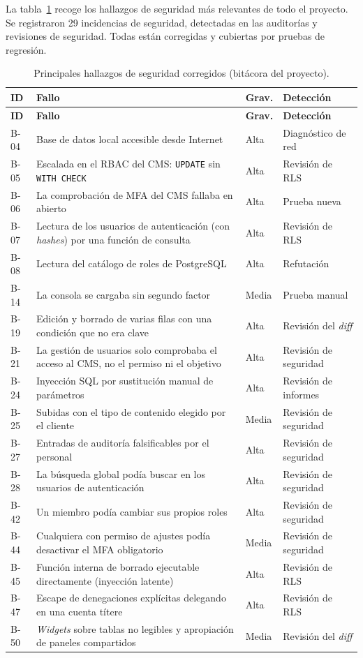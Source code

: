 La tabla~\ref{tab:pru-hallazgos} recoge los hallazgos de seguridad más
relevantes de todo el proyecto. Se registraron 29 incidencias de
seguridad, detectadas en las auditorías y revisiones de seguridad. Todas están
corregidas y cubiertas por
pruebas de regresión.

\begin{longtable}{@{}l>{\raggedright\arraybackslash}p{8.4cm}ll@{}}
  \caption{Principales hallazgos de seguridad corregidos (bitácora del proyecto).}\label{tab:pru-hallazgos}\\
  \toprule
  \textbf{ID} & \textbf{Fallo} & \textbf{Grav.} & \textbf{Detección} \\
  \midrule
  \endfirsthead
  \toprule
  \textbf{ID} & \textbf{Fallo} & \textbf{Grav.} & \textbf{Detección} \\
  \midrule
  \endhead
  \bottomrule
  \endfoot
  B-04 & Base de datos local accesible desde Internet & Alta & Diagnóstico de red \\
  B-05 & Escalada en el RBAC del CMS: \texttt{UPDATE} sin \texttt{WITH CHECK} & Alta & Revisión de RLS \\
  B-06 & La comprobación de MFA del CMS fallaba en abierto & Alta & Prueba nueva \\
  B-07 & Lectura de los usuarios de autenticación (con \textit{hashes}) por una función de consulta & Alta & Revisión de RLS \\
  B-08 & Lectura del catálogo de roles de PostgreSQL & Alta & Refutación \\
  B-14 & La consola se cargaba sin segundo factor & Media & Prueba manual \\
  B-19 & Edición y borrado de varias filas con una condición que no era clave & Alta & Revisión del \textit{diff} \\
  B-21 & La gestión de usuarios solo comprobaba el acceso al CMS, no el permiso ni el objetivo & Alta & Revisión de seguridad \\
  B-24 & Inyección SQL por sustitución manual de parámetros & Alta & Revisión de informes \\
  B-25 & Subidas con el tipo de contenido elegido por el cliente & Media & Revisión de seguridad \\
  B-27 & Entradas de auditoría falsificables por el personal & Alta & Revisión de seguridad \\
  B-28 & La búsqueda global podía buscar en los usuarios de autenticación & Alta & Revisión de seguridad \\
  B-42 & Un miembro podía cambiar sus propios roles & Alta & Revisión de seguridad \\
  B-44 & Cualquiera con permiso de ajustes podía desactivar el MFA obligatorio & Media & Revisión de seguridad \\
  B-45 & Función interna de borrado ejecutable directamente (inyección latente) & Alta & Revisión de RLS \\
  B-47 & Escape de denegaciones explícitas delegando en una cuenta títere & Alta & Revisión de RLS \\
  B-50 & \textit{Widgets} sobre tablas no legibles y apropiación de paneles compartidos & Media & Revisión del \textit{diff} \\
\end{longtable}

